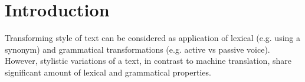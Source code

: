 \section{Introduction}


Transforming style of text can be considered as application of lexical (e.g. using a synonym) and grammatical transformations (e.g. active vs passive voice). However, stylistic variations of a text, in contrast to machine translation, share significant amount of lexical and grammatical properties. 




